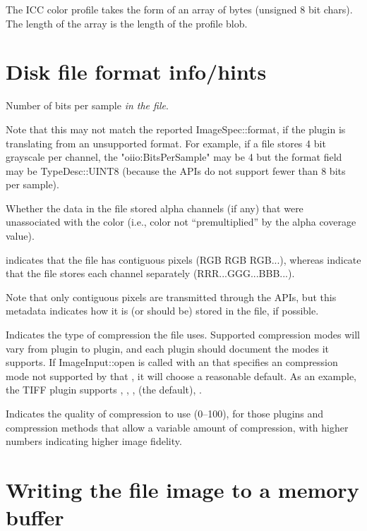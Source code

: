 The ICC color profile takes the form of an array of bytes (unsigned 8 bit
chars). The length of the array is the length of the profile blob.
\apiend


\section{Disk file format info/hints}

Number of bits per sample \emph{in the file}.  

Note that this may not match the reported {\cf ImageSpec::format}, if
the plugin is translating from an unsupported format.  For example, if a
file stores 4 bit grayscale per channel, the {\cf "oiio:BitsPerSample"} may
be 4 but the {\cf format} field may be {\cf TypeDesc::UINT8} (because
the \product APIs do not support fewer than 8 bits per sample).
\apiend

Whether the data in the file stored alpha channels (if any) that were
unassociated with the color (i.e., color not ``premultiplied'' by the
alpha coverage value).
\apiend

 indicates that the file has contiguous pixels (RGB RGB
RGB...), whereas  indicate that the file stores each
channel separately (RRR...GGG...BBB...).

Note that only contiguous pixels are transmitted through the \product
APIs, but this metadata indicates how it is (or should be) stored in the
file, if possible.
\apiend

Indicates the type of compression the file uses.  Supported compression
modes will vary from \ImageInput plugin to plugin, and each plugin
should document the modes it supports.  If {\cf ImageInput::open} is
called with an \ImageSpec that specifies an compression mode not
supported by that \ImageInput, it will choose a reasonable default.
As an example, the TIFF \ImageInput plugin supports ,
, ,  (the default), .
\apiend

Indicates the quality of compression to use (0--100), for those 
plugins and compression methods that allow a variable amount of 
compression, with higher numbers indicating higher image fidelity.
\apiend

\section{Writing the file image to a memory buffer}

